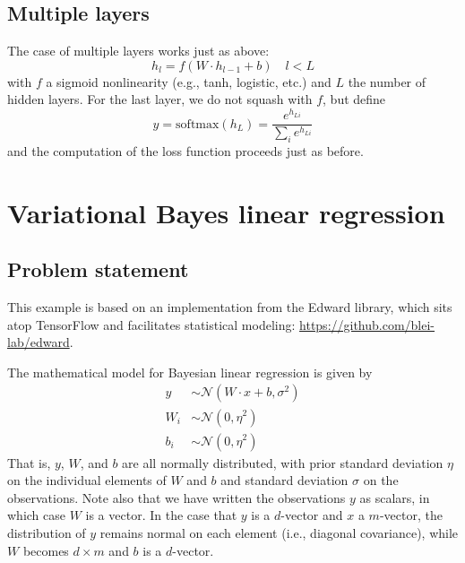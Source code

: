 \documentclass[10pt]{article}
\begin{document}
\subsection{Multiple layers}
The case of multiple layers works just as above:
\begin{equation}
    h_l = f(W \cdot h_{l-1} + b) \quad l < L
\end{equation}
with $f$ a sigmoid nonlinearity (e.g., tanh, logistic, etc.) and $L$ the number of hidden layers. For the last layer, we do not squash with $f$, but define
\begin{equation}
    y = \mathrm{softmax}(h_L) = \frac{e^{h_{Li}}}{\sum_i e^{h_{Li}}}
\end{equation}
and the computation of the loss function proceeds just as before.

\section{Variational Bayes linear regression}
\subsection{Problem statement}
This example is based on an implementation from the Edward library, which sits atop TensorFlow and facilitates statistical modeling: \url{https://github.com/blei-lab/edward}.

The mathematical model for Bayesian linear regression is given by
\begin{align}
    \label{pmodel}
    y &\sim \mathcal{N}(W \cdot x + b, \sigma^2) \\
    W_i &\sim \mathcal{N}(0, \eta^2) \\
    b_i &\sim \mathcal{N}(0, \eta^2)
\end{align}
That is, $y$, $W$, and $b$ are all normally distributed, with prior standard deviation $\eta$ on the individual elements of $W$ and $b$ and standard deviation $\sigma$ on the observations. Note also that we have written the observations $y$ as scalars, in which case $W$ is a vector. In the case that $y$ is a $d$-vector and $x$ a $m$-vector, the distribution of $y$ remains normal on each element (i.e., diagonal covariance), while $W$ becomes $d \times m$ and $b$ is a $d$-vector.
\end{document}

